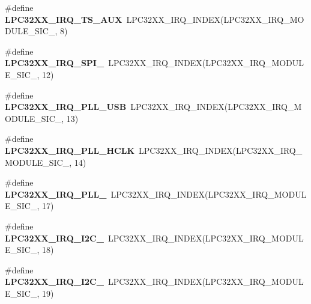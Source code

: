 \begin{DoxyCompactItemize}
\#define {\bfseries L\+P\+C32\+X\+X\+\_\+\+I\+R\+Q\+\_\+\+T\+S\+\_\+\+A\+UX}~L\+P\+C32\+X\+X\+\_\+\+I\+R\+Q\+\_\+\+I\+N\+D\+EX(L\+P\+C32\+X\+X\+\_\+\+I\+R\+Q\+\_\+\+M\+O\+D\+U\+L\+E\+\_\+\+S\+I\+C\+\_, 8)
\item 
\mbox{\label{group__lpc32xx__interrupt_gabff9a47b8aed24e243d9774a0666bb13}} 
\#define {\bfseries L\+P\+C32\+X\+X\+\_\+\+I\+R\+Q\+\_\+\+S\+P\+I\+\_}~L\+P\+C32\+X\+X\+\_\+\+I\+R\+Q\+\_\+\+I\+N\+D\+EX(L\+P\+C32\+X\+X\+\_\+\+I\+R\+Q\+\_\+\+M\+O\+D\+U\+L\+E\+\_\+\+S\+I\+C\+\_, 12)
\item 
\mbox{\label{group__lpc32xx__interrupt_ga83064f07432de57928256ad12c358dd0}} 
\#define {\bfseries L\+P\+C32\+X\+X\+\_\+\+I\+R\+Q\+\_\+\+P\+L\+L\+\_\+\+U\+SB}~L\+P\+C32\+X\+X\+\_\+\+I\+R\+Q\+\_\+\+I\+N\+D\+EX(L\+P\+C32\+X\+X\+\_\+\+I\+R\+Q\+\_\+\+M\+O\+D\+U\+L\+E\+\_\+\+S\+I\+C\+\_, 13)
\item 
\mbox{\label{group__lpc32xx__interrupt_gaac28c254aa8f8f58dad0a25953e6dac8}} 
\#define {\bfseries L\+P\+C32\+X\+X\+\_\+\+I\+R\+Q\+\_\+\+P\+L\+L\+\_\+\+H\+C\+LK}~L\+P\+C32\+X\+X\+\_\+\+I\+R\+Q\+\_\+\+I\+N\+D\+EX(L\+P\+C32\+X\+X\+\_\+\+I\+R\+Q\+\_\+\+M\+O\+D\+U\+L\+E\+\_\+\+S\+I\+C\+\_, 14)
\item 
\mbox{\label{group__lpc32xx__interrupt_ga686685b75f7056bbe1dc0476ce5e8ab9}} 
\#define {\bfseries L\+P\+C32\+X\+X\+\_\+\+I\+R\+Q\+\_\+\+P\+L\+L\+\_}~L\+P\+C32\+X\+X\+\_\+\+I\+R\+Q\+\_\+\+I\+N\+D\+EX(L\+P\+C32\+X\+X\+\_\+\+I\+R\+Q\+\_\+\+M\+O\+D\+U\+L\+E\+\_\+\+S\+I\+C\+\_, 17)
\item 
\mbox{\label{group__lpc32xx__interrupt_ga802d1e97002d44b6cf96754ff4f5820c}} 
\#define {\bfseries L\+P\+C32\+X\+X\+\_\+\+I\+R\+Q\+\_\+\+I2\+C\+\_}~L\+P\+C32\+X\+X\+\_\+\+I\+R\+Q\+\_\+\+I\+N\+D\+EX(L\+P\+C32\+X\+X\+\_\+\+I\+R\+Q\+\_\+\+M\+O\+D\+U\+L\+E\+\_\+\+S\+I\+C\+\_, 18)
\item 
\mbox{\label{group__lpc32xx__interrupt_gada83f611f477aba42e4762c36d51338a}} 
\#define {\bfseries L\+P\+C32\+X\+X\+\_\+\+I\+R\+Q\+\_\+\+I2\+C\+\_}~L\+P\+C32\+X\+X\+\_\+\+I\+R\+Q\+\_\+\+I\+N\+D\+EX(L\+P\+C32\+X\+X\+\_\+\+I\+R\+Q\+\_\+\+M\+O\+D\+U\+L\+E\+\_\+\+S\+I\+C\+\_, 19)

\end{DoxyCompactItemize}

